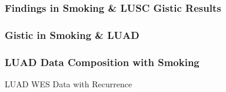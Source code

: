 \documentclass{beamer}
\begin{document}
    \begin{frame}
        \frametitle{Findings in Smoking \& LUSC Gistic Results}
    \end{frame}

    \subsubsection{Gistic in Smoking \& LUAD}
    \begin{frame}
        \frametitle{LUAD Data Composition with Smoking}

        \begin{table}
            \caption{LUAD WES Data with Recurrence}
            \resizebox{!}{0.3 \textheight}
            {}
        \end{table}
    \end{frame}
\end{document}
